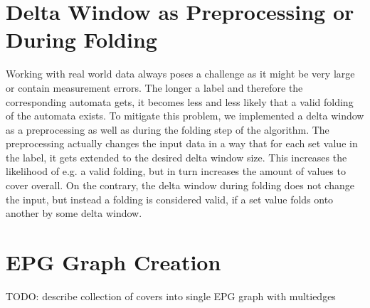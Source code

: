 \section{Delta Window as Preprocessing or During Folding}
\label{ch:novel-algos:delta-window}
Working with real world data always poses a challenge as it might be very large or contain measurement errors.
The longer a label and therefore the corresponding automata gets, it becomes less and less likely that a valid folding of the automata exists.
To mitigate this problem, we implemented a delta window as a preprocessing as well as during the folding step of the algorithm.
The preprocessing actually changes the input data in a way that for each set value in the label, it gets extended to the desired delta window size.
This increases the likelihood of e.g. a valid folding, but in turn increases the amount of values to cover overall. On the contrary, the delta window during folding does not change the input, but instead a folding is considered valid, if a set value folds onto another by some delta window.

\section{EPG Graph Creation}
\label{ch:novel-algos:ept-graph}
TODO: describe collection of covers into single EPG graph with multiedges
